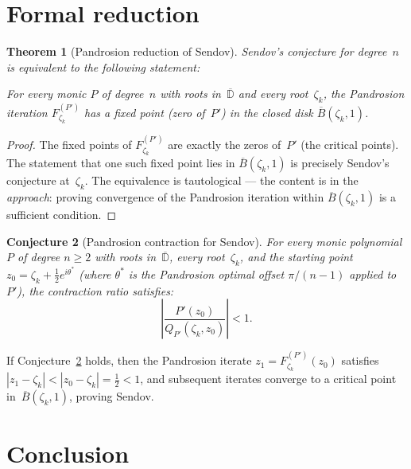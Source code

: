 \documentclass[11pt,a4paper]{article}
\newtheorem{theorem}{Theorem}[section]
\newtheorem{conjecture}[theorem]{Conjecture}
\theoremstyle{definition}
\theoremstyle{remark}
\begin{document}
\section{Formal reduction}
\label{sec:reduction}

\begin{theorem}[Pandrosion reduction of Sendov]
\label{thm:reduction}
Sendov's conjecture for degree~$n$ is equivalent to the following statement:

For every monic $P$ of degree~$n$ with roots in~$\overline{\mathbb{D}}$ and every root~$\zeta_k$, the Pandrosion iteration $F_{\zeta_k}^{(P')}$ has a fixed point (zero of~$P'$) in the closed disk $\overline{B}(\zeta_k, 1)$.
\end{theorem}

\begin{proof}
The fixed points of $F_{\zeta_k}^{(P')}$ are exactly the zeros of~$P'$ (the critical points).  The statement that one such fixed point lies in $\overline{B}(\zeta_k, 1)$ is precisely Sendov's conjecture at~$\zeta_k$.  The equivalence is tautological --- the content is in the \emph{approach}: proving convergence of the Pandrosion iteration within $\overline{B}(\zeta_k, 1)$ is a sufficient condition.
\end{proof}

\begin{conjecture}[Pandrosion contraction for Sendov]
\label{conj:contraction}
For every monic polynomial $P$ of degree $n \geq 2$ with roots in~$\overline{\mathbb{D}}$, every root~$\zeta_k$, and the starting point $z_0 = \zeta_k + \frac{1}{2}e^{i\theta^*}$ (where $\theta^*$ is the Pandrosion optimal offset $\pi/(n-1)$ applied to~$P'$), the contraction ratio satisfies:
\[
\left|\frac{P'(z_0)}{Q_{P'}(\zeta_k, z_0)}\right| < 1.
\]
\end{conjecture}

If Conjecture~\ref{conj:contraction} holds, then the Pandrosion iterate $z_1 = F_{\zeta_k}^{(P')}(z_0)$ satisfies $|z_1 - \zeta_k| < |z_0 - \zeta_k| = \frac{1}{2} < 1$, and subsequent iterates converge to a critical point in~$\overline{B}(\zeta_k, 1)$, proving Sendov.

\section{Conclusion}
\end{document}
